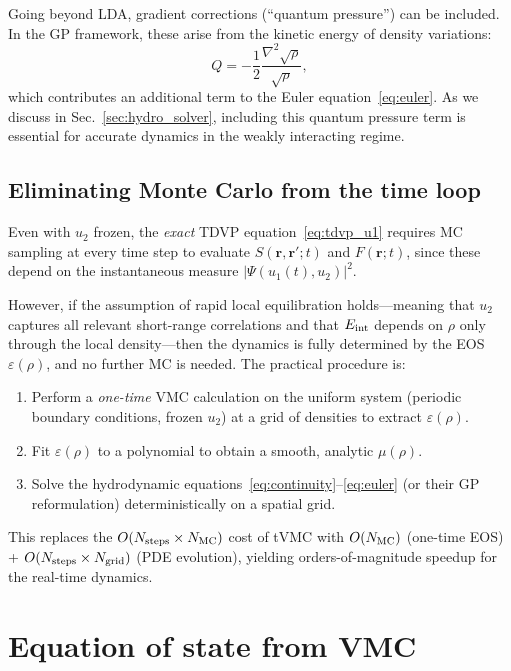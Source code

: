 \documentclass[twocolumn,superscriptaddress,aps,pra,longbibliography]{revtex4-2}
\newcommand{\br}{\mathbf{r}}
\begin{document}
Going beyond LDA, gradient corrections (``quantum pressure'') can be
included.  In the GP framework, these arise from the kinetic energy of
density variations:
\begin{equation}
Q = -\frac{1}{2}\frac{\nabla^2\sqrt{\rho}}{\sqrt{\rho}},
\label{eq:QP}
\end{equation}
which contributes an additional term to the Euler
equation~\eqref{eq:euler}.  As we discuss in Sec.~\ref{sec:hydro_solver},
including this quantum pressure term is essential for accurate dynamics in
the weakly interacting regime.

\subsection{Eliminating Monte Carlo from the time loop}
\label{sec:eliminate_mc}

Even with $u_2$ frozen, the \emph{exact} TDVP
equation~\eqref{eq:tdvp_u1} requires MC sampling at every time step to
evaluate $S(\br,\br';t)$ and $F(\br;t)$, since these depend on the
instantaneous measure $|\Psi(u_1(t), u_2)|^2$.

However, if the assumption of rapid local equilibration holds---meaning
that $u_2$ captures all relevant short-range correlations and that
$E_{\rm int}$ depends on $\rho$ only through the local density---then the
dynamics is fully determined by the EOS $\varepsilon(\rho)$, and no
further MC is needed.  The practical procedure is:
\begin{enumerate}
\item Perform a \emph{one-time} VMC calculation on the uniform system
(periodic boundary conditions, frozen $u_2$) at a grid of densities to
extract $\varepsilon(\rho)$.
\item Fit $\varepsilon(\rho)$ to a polynomial to obtain a smooth, analytic
$\mu(\rho)$.
\item Solve the hydrodynamic equations~\eqref{eq:continuity}--\eqref{eq:euler}
(or their GP reformulation) deterministically on a spatial grid.
\end{enumerate}
This replaces the $O(N_{\rm steps} \times N_{\rm MC})$ cost of tVMC with
$O(N_{\rm MC})$ (one-time EOS) + $O(N_{\rm steps} \times N_{\rm grid})$
(PDE evolution), yielding orders-of-magnitude speedup for the real-time
dynamics.

\section{Equation of state from VMC}
\label{sec:eos}
\end{document}
